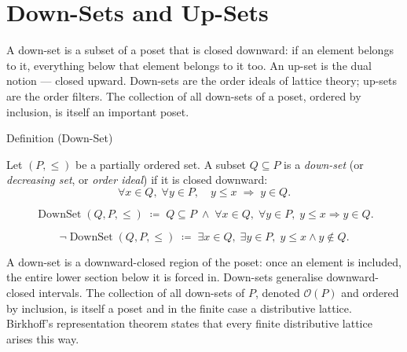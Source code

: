 
\section{Down-Sets and Up-Sets}
\label{sec:down-up-sets}

\begin{remark*}
A down-set is a subset of a poset that is closed downward: if an element
belongs to it, everything below that element belongs to it too.  An up-set
is the dual notion --- closed upward.  Down-sets are the order ideals of
lattice theory; up-sets are the order filters.  The collection of all
down-sets of a poset, ordered by inclusion, is itself an important poset.
\end{remark*}


\begin{definitionbox}{Definition (Down-Set)}
\begin{definition}
\label{def:down-set}
Let $(P, \leq)$ be a partially ordered set.  A subset $Q \subseteq P$ is
a \emph{down-set} (or \emph{decreasing set}, or \emph{order ideal}) if it
is closed downward:
\[
\forall x \in Q,\; \forall y \in P,\quad y \leq x \;\Longrightarrow\; y \in Q.
\]
\end{definition}
\end{definitionbox}

\begin{remark*}
\[
\operatorname{DownSet}(Q, P, \leq)
\;\coloneqq\;
Q \subseteq P
\;\land\;
\forall x \in Q,\; \forall y \in P,\;
y \leq x \Rightarrow y \in Q.
\]
\end{remark*}

\begin{remark*}
\[
\neg\operatorname{DownSet}(Q, P, \leq)
\;\coloneqq\;
\exists x \in Q,\; \exists y \in P,\;
y \leq x \land y \notin Q.
\]
\end{remark*}

\begin{remark*}[Interpretation]
A down-set is a downward-closed region of the poset: once an element is
included, the entire lower section below it is forced in.  Down-sets
generalise downward-closed intervals.  The collection of all down-sets of
$P$, denoted $\mathcal{O}(P)$ and ordered by inclusion, is itself a poset
and in the finite case a distributive lattice.  Birkhoff's representation
theorem states that every finite distributive lattice arises this way.
\end{remark*}

